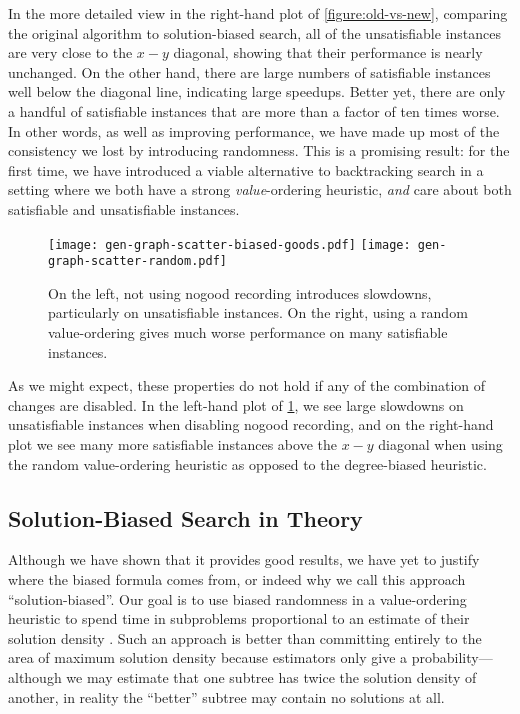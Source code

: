 \documentclass[runningheads]{llncs}
\begin{document}
In the more detailed view in the right-hand plot of \cref{figure:old-vs-new}, comparing the original
algorithm to solution-biased search, all of the unsatisfiable instances are very close to the $x-y$
diagonal, showing that their performance is nearly unchanged. On the other hand, there are large
numbers of satisfiable instances well below the diagonal line, indicating large speedups.  Better
yet, there are only a handful of satisfiable instances that are more than a factor of ten times
worse.  In other words, as well as improving performance, we have made up most of the consistency we
lost by introducing randomness.  This is a promising result: for the first time, we have introduced
a viable alternative to backtracking search in a setting where we both have a strong
\emph{value}-ordering heuristic, \emph{and} care about both satisfiable and unsatisfiable instances.

\begin{figure}[tb]
    \texttt{[image: gen-graph-scatter-biased-goods.pdf]}
    \hfill
    \texttt{[image: gen-graph-scatter-random.pdf]}
    \caption{On the left, not using nogood recording introduces slowdowns, particularly on
    unsatisfiable instances. On the right, using a random value-ordering gives much worse
    performance on many satisfiable instances.}
    \label{figure:features}
\end{figure}

As we might expect, these properties do not hold if any of the combination of changes are disabled.
In the left-hand plot of \cref{figure:features}, we see large slowdowns on unsatisfiable instances
when disabling nogood recording, and on the right-hand plot we see many more satisfiable instances
above the $x-y$ diagonal when using the random value-ordering heuristic as opposed to the
degree-biased heuristic.

\subsection{Solution-Biased Search in Theory}

Although we have shown that it provides good results, we have yet to justify where the biased
formula comes from, or indeed why we call this approach ``solution-biased''.  Our goal is to use
biased randomness in a value-ordering heuristic to spend time in subproblems proportional to an
estimate of their solution density \cite{DBLP:journals/jair/PesantQZ12}. Such an approach is better
than committing entirely to the area of maximum solution density because estimators only give a
probability---although we may estimate that one subtree has twice the solution density of another,
in reality the ``better'' subtree may contain no solutions at all.
\end{document}

